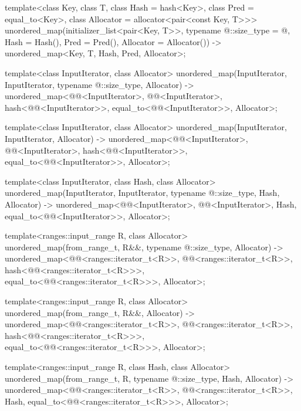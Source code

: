 \documentclass{wg21}
\begin{document}
\begin{codeblock}

template<class Key, class T, class Hash = hash<Key>,
class Pred = equal_to<Key>, class Allocator = allocator<pair<const Key, T>>>
unordered_map(initializer_list<pair<Key, T>>,
typename @\seebelow@::size_type = @\seebelow@, Hash = Hash(),
Pred = Pred(), Allocator = Allocator())
-> unordered_map<Key, T, Hash, Pred, Allocator>;

template<class InputIterator, class Allocator>
unordered_map(InputIterator, InputIterator, typename @\seebelow@::size_type, Allocator)
-> unordered_map<@@<InputIterator>, @@<InputIterator>,
hash<@@<InputIterator>>,
equal_to<@@<InputIterator>>, Allocator>;

template<class InputIterator, class Allocator>
unordered_map(InputIterator, InputIterator, Allocator)
-> unordered_map<@@<InputIterator>, @@<InputIterator>,
hash<@@<InputIterator>>,
equal_to<@@<InputIterator>>, Allocator>;

template<class InputIterator, class Hash, class Allocator>
unordered_map(InputIterator, InputIterator, typename @\seebelow@::size_type, Hash, Allocator)
-> unordered_map<@@<InputIterator>, @@<InputIterator>, Hash,
equal_to<@@<InputIterator>>, Allocator>;


\end{codeblock}
\begin{addedblock}
\begin{codeblock}
template<ranges::input_range R, class Allocator>
unordered_map(from_range_t, R\&\&, typename @\seebelow@::size_type, Allocator)
-> unordered_map<@@<ranges::iterator_t<R>>,
        @@<ranges::iterator_t<R>>,
        hash<@@<ranges::iterator_t<R>>>,
        equal_to<@@<ranges::iterator_t<R>>>, Allocator>;


template<ranges::input_range R, class Allocator>
unordered_map(from_range_t, R\&\&, Allocator)
-> unordered_map<@@<ranges::iterator_t<R>>,
    @@<ranges::iterator_t<R>>,
    hash<@@<ranges::iterator_t<R>>>,
    equal_to<@@<ranges::iterator_t<R>>>, Allocator>;

template<ranges::input_range R, class Hash, class Allocator>
unordered_map(from_range_t, R, typename @\seebelow@::size_type, Hash, Allocator)
-> unordered_map<@@<ranges::iterator_t<R>>,
    @@<ranges::iterator_t<R>>,
    Hash,
    equal_to<@@<ranges::iterator_t<R>>>, Allocator>;
\end{codeblock}
\end{addedblock}
\end{document}
